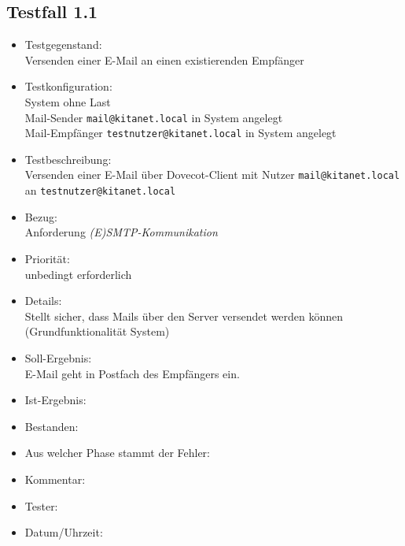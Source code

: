 \subsection{Testfall 1.1}
\begin{itemize}
	\item Testgegenstand:\\
	Versenden einer E-Mail an einen existierenden Empfänger
	\item Testkonfiguration:\\
	System ohne Last\\
	Mail-Sender \verb+mail@kitanet.local+ in System angelegt\\
	Mail-Empfänger \verb+testnutzer@kitanet.local+ in System angelegt
	\item Testbeschreibung:\\
	Versenden einer E-Mail über Dovecot-Client mit Nutzer \verb+mail@kitanet.local+ \\ an \verb+testnutzer@kitanet.local+
	\item Bezug:\\
	Anforderung \textit{(E)SMTP-Kommunikation}
	\item Priorität:\\
	unbedingt erforderlich
	\item Details:\\
	Stellt sicher, dass Mails über den Server versendet werden können (Grundfunktionalität System)
	\item Soll-Ergebnis:\\
	E-Mail geht in Postfach des Empfängers ein.
	\item Ist-Ergebnis:\\
	\item Bestanden:\\
	\item Aus welcher Phase stammt der Fehler:\\
	\item Kommentar:\\
	\item Tester:\\
	\item Datum/Uhrzeit:\\
\end{itemize}

